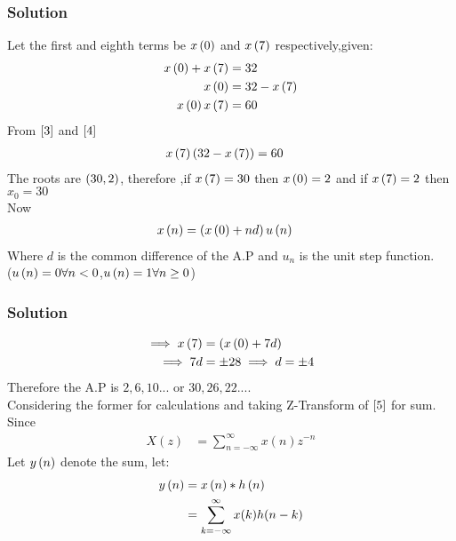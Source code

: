 \documentclass{beamer}
\begin{document}
\begin{frame}
\frametitle{Solution}
Let the first and eighth terms be $x\left(0\right)$ and $x\left(7\right)$ respectively,given:
\begin{align}
x\left(0\right)+x\left(7\right) &= 32\\
x\left(0\right) &= 32 - x\left(7\right)\label{3} \\
x\left(0\right)x\left(7\right) &= 60 \label{4}
\end{align}
From $\eqref{3}$ and $\eqref{4}$
\begin{align}
    x\left(7\right)\left(32-x\left(7\right)\right) &= 60
\end{align}
The roots are $\left(30,2\right)$, therefore ,if $x\left(7\right)=30$ then $x\left(0\right)=2$ and if $x\left(7\right)=2$ then $x_0=30$\\
Now
\begin{align}
    x\left(n\right) &= \left(x\left(0\right) + nd\right)u\left(n\right)\label{5}
    \end{align}
    Where $d$ is the common difference of the A.P and $u_n$ is the unit step function.\\($u\left(n\right)=0 \forall n<0$,$u\left(n\right)=1 \forall n\geq0$)
\end{frame}






\begin{frame}
\frametitle{Solution}
\begin{align}
        \implies     x\left(7\right) &= \left(x\left(0\right) + 7d\right)\\
    \implies 7d &= \pm 28 \implies d = \pm 4
\end{align}
Therefore the A.P is $2,6,10...$ or $30,26,22...$.\\
Considering the former for calculations and taking Z-Transform of $\eqref{5}$ for sum.\\
Since
\begin{align}
X(z) &= \sum_{n=-\infty}^{\infty} x(n)z^{-n} \label{6}
\end{align}
Let $y\left(n\right)$ denote the sum, let:
\begin{align}
    y\left(n\right) &= x\left(n\right) * h\left(n\right)\\
    &= \sum_{k=-\infty}^{\infty} x(k)h(n-k)
\end{align}    
\end{frame}
\end{document}
